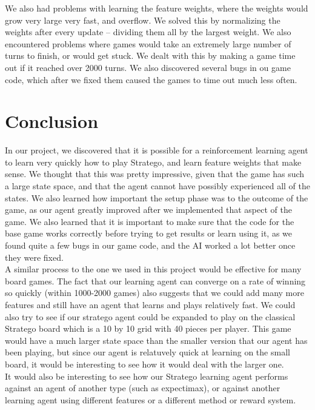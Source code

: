 \documentclass[letterpaper]{article}
\begin{document}
We also had problems with learning the feature weights, where the weights would grow very large very fast, and overflow. We solved this by normalizing the weights after every update -- dividing them all by the largest weight. We also encountered problems where games would take an extremely large number of turns to finish, or would get stuck. We dealt with this by making a game time out if it reached over 2000 turns. We also discovered several bugs in ou game code, which after we fixed them caused the games to time out much less often.

\section{Conclusion}
In our project, we discovered that it is possible for a reinforcement learning agent to learn very quickly how to play Stratego, and learn feature weights that make sense. We thought that this was pretty impressive, given that the game has such a large state space, and that the agent cannot have possibly experienced all of the states. We also learned how important the setup phase was to the outcome of the game, as our agent greatly improved after we implemented that aspect of the game. We also learned that it is important to make sure that the code for the base game works correctly before trying to get results or learn using it, as we found quite a few bugs in our game code, and the AI worked a lot better once they were fixed.
\\

A similar process to the one we used in this project would be effective for many board games. The fact that our learning agent can converge on a rate of winning so quickly (within 1000-2000 games) also suggests that we could add many more features and still have an agent that learns and plays relatively fast. We could also try to see if our stratego agent could be expanded to play on the classical Stratego board which is a 10 by 10 grid with 40 pieces per player. This game would have a much larger state space than the smaller version that our agent has been playing, but since our agent is relatuvely quick at learning on the small board, it would be interesting to see how it would deal with the larger one.\\

It would also be interesting to see how our Stratego learning agent performs against an agent of another type (such as expectimax), or against another learning agent using different features or a different method or reward system.
\end{document}
